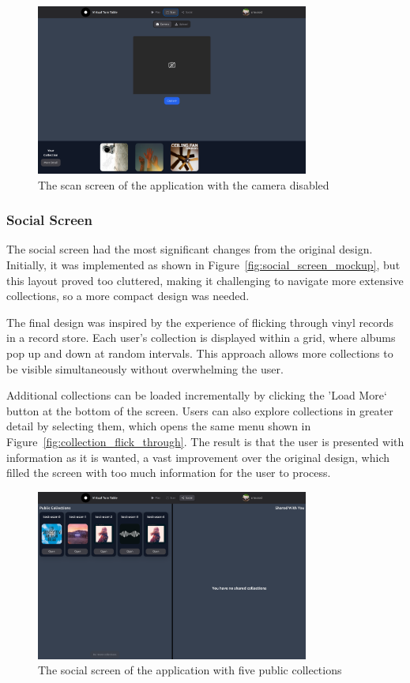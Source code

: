 \begin{figure} [H]
    \centering
    \includegraphics[width=0.8\textwidth]{figures/scan_screen.png}
    \caption{The scan screen of the application with the camera disabled}
    \label{fig:scan_screen}
\end{figure}

\subsubsection{Social Screen}
The social screen had the most significant changes from the original design. Initially, it was implemented as shown in Figure~\ref{fig:social_screen_mockup}, but this layout proved too cluttered, making it challenging to navigate more extensive collections, so a more compact design was needed.

The final design was inspired by the experience of flicking through vinyl records in a record store. Each user's collection is displayed within a grid, where albums pop up and down at random intervals. This approach allows more collections to be visible simultaneously without overwhelming the user.

Additional collections can be loaded incrementally by clicking the 'Load More` button at the bottom of the screen. Users can also explore collections in greater detail by selecting them, which opens the same menu shown in Figure~\ref{fig:collection_flick_through}. The result is that the user is presented with information as it is wanted, a vast improvement over the original design, which filled the screen with too much information for the user to process.

\begin{figure} [H]
    \centering
    \includegraphics[width=0.8\textwidth]{figures/social_screen.png}
    \caption{The social screen of the application with five public collections}
    \label{fig:social screen}
\end{figure}

